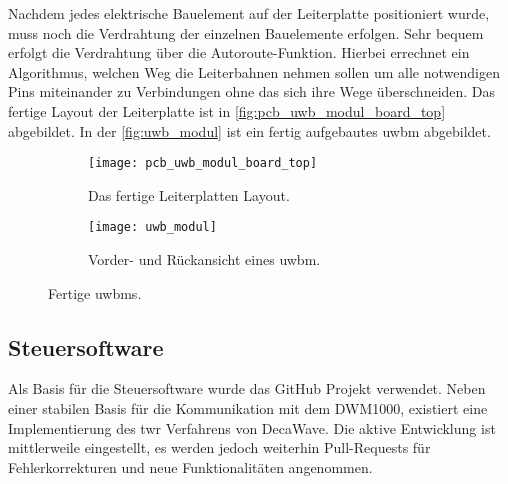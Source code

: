 Nachdem jedes elektrische Bauelement auf der Leiterplatte positioniert wurde, muss noch die Verdrahtung der einzelnen Bauelemente erfolgen. Sehr bequem erfolgt die Verdrahtung über die Autoroute-Funktion. Hierbei errechnet ein Algorithmus, welchen Weg die Leiterbahnen nehmen sollen um alle notwendigen Pins miteinander zu Verbindungen ohne das sich ihre Wege überschneiden. Das fertige Layout der Leiterplatte ist in \autoref{fig:pcb_uwb_modul_board_top} abgebildet. In der \autoref{fig:uwb_modul} ist ein fertig aufgebautes \Gls{uwbm} abgebildet.


%

\begin{figure}
	\begin{subfigure}[t]{0.3\textwidth}
		\texttt{[image: pcb\_uwb\_modul\_board\_top]}
		\caption{Das fertige Leiterplatten Layout.}
		\label{fig:pcb_uwb_modul_board_top}
	\end{subfigure}
	\hfill
	\begin{subfigure}[t]{0.6\textwidth}
		\centering
		\texttt{[image: uwb\_modul]}
		\caption{Vorder- und Rückansicht eines \gls{uwbm}.}
		\label{fig:uwb_modul}
	\end{subfigure}
	\caption{Fertige \glspl{uwbm}.}
	\label{fig:fertige_uwb_module}
\end{figure}


%
%
\subsection{Steuersoftware}

Als Basis für die Steuersoftware wurde das GitHub Projekt \cite{Trojer2015} verwendet. Neben einer stabilen Basis für die Kommunikation mit dem DWM1000, existiert eine Implementierung des \Gls{twr} Verfahrens von DecaWave. Die aktive Entwicklung ist mittlerweile eingestellt, es werden jedoch weiterhin Pull-Requests\footnotemark{} für Fehlerkorrekturen und neue Funktionalitäten angenommen.

